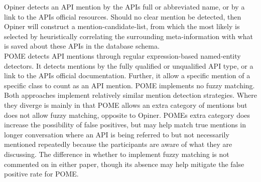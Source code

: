 \documentclass[a4paper,10pt, bibliography=totocnumbered]{scrreprt}
\begin{document}
Opiner detects an API mention by the APIs full or abbreviated name, or by a link to the APIs official resources. Should no clear mention be detected, then Opiner will construct a mention-candidate-list, from which the most likely is selected by heuristically correlating the surrounding meta-information with what is saved about these APIs in the database schema.\\
POME detects API mentions through regular expression-based named-entity detectors. It detects mentions by the fully qualified or unqualified API type, or a link to the APIs official documentation. Further, it allow a specific mention of a specific class to count as an API mention. POME implements no fuzzy matching.\\
Both approaches implement relatively similar mention detection strategies. Where they diverge is mainly in that POME allows an extra category of mentions but does not allow fuzzy matching, opposite to Opiner. POMEs extra category does increase the possibility of false positives, but may help match true mentions in longer conversation where an API is being referred to but not necessarily mentioned repeatedly because the participants are aware of what they are discussing. The difference in whether to implement fuzzy matching is not commented on in either paper, though its absence may help mitigate the false positive rate for POME.
\end{document}
